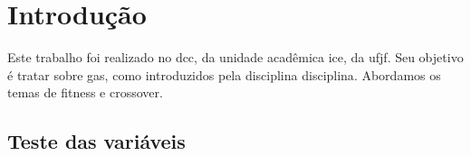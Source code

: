 \chapter{Introdução}%
\label{cap:introducao}


Este trabalho foi realizado no \gls{dcc}, da unidade acadêmica \gls{ice}, da \gls{ufjf}.
Seu objetivo é tratar sobre \glspl{ga}, como introduzidos pela disciplina \gls{disciplina}.
Abordamos os temas de \gls{fitness} e \gls{crossover}.

\section{Teste das variáveis}

\testaVariaveis{}

\lipsum[1-4]
